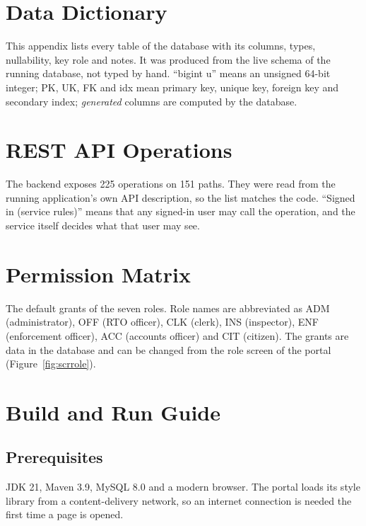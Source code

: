 \chapter{Data Dictionary}\label{app:dict}
This appendix lists every table of the database with its columns, types, nullability, key
role and notes. It was produced from the live schema of the running database, not typed by
hand. ``bigint u'' means an unsigned 64-bit integer; PK, UK, FK and idx mean primary key,
unique key, foreign key and secondary index; \emph{generated} columns are computed by the
database.

\begingroup\footnotesize

\endgroup

\chapter{REST API Operations}\label{app:api}
The backend exposes 225 operations on 151 paths. They were read from the running
application's own API description, so the list matches the code. ``Signed in (service
rules)'' means that any signed-in user may call the operation, and the service itself
decides what that user may see.

\begingroup\footnotesize

\endgroup

\chapter{Permission Matrix}\label{app:perms}
The default grants of the seven roles. Role names are abbreviated as ADM (administrator),
OFF (RTO officer), CLK (clerk), INS (inspector), ENF (enforcement officer), ACC (accounts
officer) and CIT (citizen). The grants are data in the database and can be changed from the
role screen of the portal (Figure~\ref{fig:scrrole}).

\begingroup\footnotesize

\endgroup

\chapter{Build and Run Guide}\label{app:run}
\section{Prerequisites}
JDK 21, Maven 3.9, MySQL 8.0 and a modern browser. The portal loads its style library from
a content-delivery network, so an internet connection is needed the first time a page is
opened.

